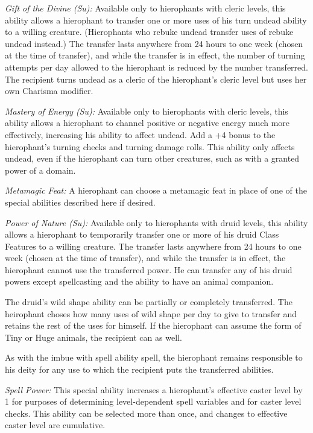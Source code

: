 {\textit{Gift of the Divine (Su):} Available only to hierophants with cleric levels, this ability allows a hierophant to transfer one or more uses of his turn undead ability to a willing creature. (Hierophants who rebuke undead transfer uses of rebuke undead instead.) The transfer lasts anywhere from 24 hours to one week (chosen at the time of transfer), and while the transfer is in effect, the number of turning attempts per day allowed to the hierophant is reduced by the number transferred. The recipient turns undead as a cleric of the hierophant's cleric level but uses her own Charisma modifier.

\textit{Mastery of Energy (Su):} Available only to hierophants with cleric levels, this ability allows a hierophant to channel positive or negative energy much more effectively, increasing his ability to affect undead. Add a +4 bonus to the hierophant's turning checks and turning damage rolls. This ability only affects undead, even if the hierophant can turn other creatures, such as with a granted power of a domain.

\textit{Metamagic Feat:} A hierophant can choose a metamagic feat in place of one of the special abilities described here if desired.

\textit{Power of Nature (Su):} Available only to hierophants with druid levels, this ability allows a hierophant to temporarily transfer one or more of his druid Class Features to a willing creature. The transfer lasts anywhere from 24 hours to one week (chosen at the time of transfer), and while the transfer is in effect, the hierophant cannot use the transferred power. He can transfer any of his druid powers except spellcasting and the ability to have an animal companion.

The druid's wild shape ability can be partially or completely transferred. The heirophant choses how many uses of wild shape per day to give to transfer and retains the rest of the uses for himself. If the hierophant can assume the form of Tiny or Huge animals, the recipient can as well.

As with the imbue with spell ability spell, the hierophant remains responsible to his deity for any use to which the recipient puts the transferred abilities.

\textit{Spell Power:} This special ability increases a hierophant's effective caster level by 1 for purposes of determining level-dependent spell variables and for caster level checks. This ability can be selected more than once, and changes to effective caster level are cumulative.

}
